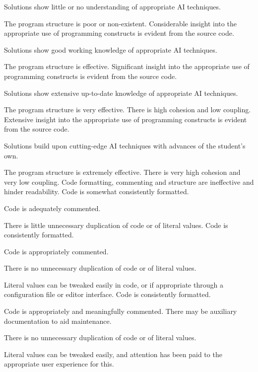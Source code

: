 \documentclass{../../fal_assignment}
\begin{document}
\begin{markingrubric}
            \par Solutions show little or no understanding of appropriate AI techniques.
            \par The program structure is poor or non-existent.
        \grade Considerable insight into the appropriate use of programming constructs is evident from the source code.
            \par Solutions show good working knowledge of appropriate AI techniques.
            \par The program structure is effective.
        \grade Significant insight into the appropriate use of programming constructs is evident from the source code.
            \par Solutions show extensive up-to-date knowledge of appropriate AI techniques.
            \par The program structure is very effective. There is high cohesion and low coupling.
        \grade Extensive insight into the appropriate use of programming constructs is evident from the source code.
            \par Solutions build upon cutting-edge AI techniques with advances of the student's own.
            \par The program structure is extremely effective. There is very high cohesion and very low coupling.
%
        \grade \fail Code formatting, commenting and structure are ineffective and hinder readability.
        \grade Code is somewhat consistently formatted.
            \par Code is adequately commented.
            \par There is little unnecessary duplication of code or of literal values.           
        \grade Code is consistently formatted.
            \par Code is appropriately commented.
            \par There is no unnecessary duplication of code or of literal values.
            \par Literal values can be tweaked easily in code, or if appropriate through a configuration file or editor interface.
        \grade Code is consistently formatted.
            \par Code is appropriately and meaningfully commented. There may be auxiliary documentation to aid maintenance.
            \par There is no unnecessary duplication of code or of literal values.
            \par Literal values can be tweaked easily, and attention has been paid to the appropriate user experience for this.
%
\end{markingrubric}
\end{document}
